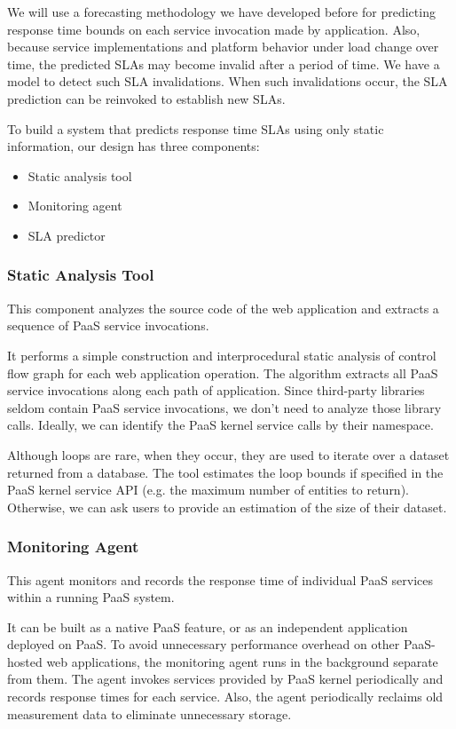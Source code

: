 \documentclass[11pt]{article}
\begin{document}
We will use a forecasting methodology we have developed before for predicting response time bounds on each service invocation
made by application. Also, because service implementations and platform behavior under load change over time,
the predicted SLAs may become invalid after a period of time. We have a model to detect such SLA invalidations.
When such invalidations occur, the SLA prediction can be reinvoked to establish new SLAs.

To build a system that predicts response time SLAs using only static information, our design has three components:
\begin{itemize}
\item Static analysis tool
\item Monitoring agent
\item SLA predictor
\end{itemize}

\subsubsection{Static Analysis Tool}
This component analyzes the source code of the web application and extracts a sequence of PaaS service invocations.

It performs a simple construction and interprocedural static analysis of control flow graph for each web application operation.
The algorithm extracts all PaaS service invocations along each path of application. Since third-party libraries seldom contain
PaaS service invocations, we don't need to analyze those library calls. Ideally, we can identify the PaaS kernel service calls
by their namespace.

Although loops are rare, when they occur, they are used to iterate over a dataset returned from a database. The tool estimates the loop 
bounds if specified in the PaaS kernel service API (e.g. the maximum number of entities to return). Otherwise, we can ask users to provide
an estimation of the size of their dataset.

\subsubsection{Monitoring Agent}
This agent monitors and records the response time of individual PaaS services within a running PaaS system.

It can be built as a native PaaS feature, or as an independent application deployed on PaaS. To avoid unnecessary
performance overhead on other PaaS-hosted web applications, the monitoring agent runs in the background separate from them.
The agent invokes services provided by PaaS kernel periodically and records response times for each service. Also, the agent periodically
reclaims old measurement data to eliminate unnecessary storage.
\end{document}
